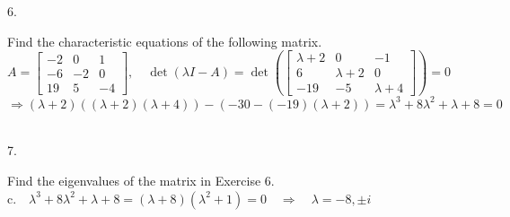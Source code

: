\documentclass[12pt]{book}
\begin{document}
\begin{CJK}{UTF8}{bsmi}
6. \begin{minipage}[t]{\dimexpr\linewidth}
Find the characteristic equations of the following matrix. \\
$A=\begin{bmatrix}
-2 & 0 & 1 \\
-6 & -2 & 0 \\
19 & 5 & -4 
\end{bmatrix}
,\quad \det(\lambda I-A) = \det(\begin{bmatrix}
\lambda+2 & 0 & -1 \\
6 & \lambda+2 & 0 \\
-19 & -5 & \lambda+4 
\end{bmatrix}) = 0$
\[
\Rightarrow (\lambda+2)((\lambda+2)(\lambda+4))-(-30-(-19)(\lambda+2))=\lambda^3+8\lambda^2+\lambda+8=0
\]
\end{minipage}\\

7. \begin{minipage}[t]{\dimexpr\linewidth}
Find the eigenvalues of the matrix in Exercise 6. \\
c.$\quad\lambda^3+8\lambda^2+\lambda+8=(\lambda+8)(\lambda^2+1)=0\quad\Rightarrow\quad\lambda=-8,\pm i$
\end{minipage}\\


\end{CJK}
\end{document}
